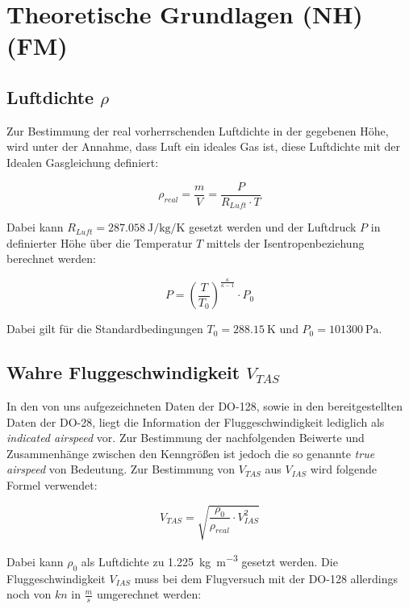 \chapter{Theoretische Grundlagen (NH)(FM)}
\label{c:TheoGrund}

\section{Luftdichte $\rho$}

Zur Bestimmung der real vorherrschenden Luftdichte in der gegebenen Höhe, wird unter der Annahme, dass Luft ein ideales Gas ist, diese Luftdichte mit der Idealen Gasgleichung definiert:

\begin{equation}
\rho_{real}=\frac{m}{V}=\frac{P}{R_{Luft} \cdot T}
\end{equation}

Dabei kann $R_{Luft}=\SI{287.058}{\joule\per\kilogram\per\kelvin}$ gesetzt werden und der Luftdruck $P$ in definierter Höhe über die Temperatur $T$ mittels der Isentropenbeziehung berechnet werden:

\begin{equation}
P=\left(\frac{T}{T_0}\right)^{\frac{\kappa}{\kappa-1}} \cdot P_0
\end{equation}

Dabei gilt für die Standardbedingungen $T_0=\SI{288.15}{\kelvin}$ und $P_0=\SI{101300}{\pascal}$.

\section{Wahre Fluggeschwindigkeit $V_{TAS}$}

In den von uns aufgezeichneten Daten der DO-128, sowie in den bereitgestellten Daten der DO-28, liegt die Information der Fluggeschwindigkeit lediglich als \textit{indicated airspeed} vor. Zur Bestimmung der nachfolgenden Beiwerte und Zusammenhänge zwischen den Kenngrößen ist jedoch die so genannte \textit{true airspeed} von Bedeutung. Zur Bestimmung von $V_{TAS}$ aus $V_{IAS}$ wird folgende Formel verwendet\cite{Kurzskript}:

\begin{equation}
V_{TAS}=\sqrt{\frac{\rho_0}{\rho_{real}} \cdot V_{IAS}^2}
\end{equation}

Dabei kann $\rho_0$ als Luftdichte zu \SI{1.225}{\kilogram\per\meter^3} gesetzt werden. Die Fluggeschwindigkeit $V_{IAS}$ muss bei dem Flugversuch mit der DO-128 allerdings noch von $kn$ in $\frac{m}{s}$ umgerechnet werden:

